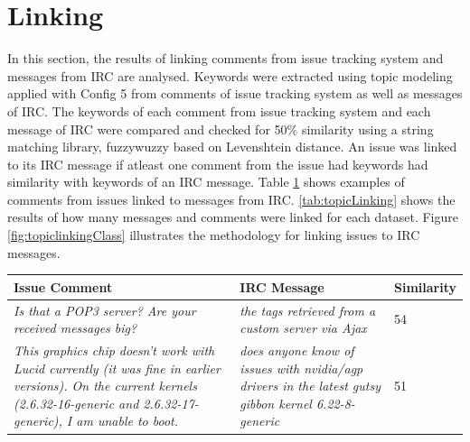\documentclass[a4paper,12pt,twoside]{report}
\begin{document}
\section{Linking}
In this section, the results of linking comments from issue tracking system and messages from \acs{IRC} are analysed. Keywords were extracted using topic modeling applied with Config 5 from comments of issue tracking system as well as messages of \acs{IRC}. The keywords of each comment from issue tracking system and each message of \acs{IRC} were compared and checked for 50\% similarity using a string matching library, fuzzywuzzy based on Levenshtein distance. An issue was linked to its \acs{IRC} message if atleast one comment from the issue had keywords had similarity with keywords of an \acs{IRC} message. Table \ref{tab:exampleLinking} shows examples of comments from issues linked to messages from \acs{IRC}. \ref{tab:topicLinking} shows the results of how many messages and comments were linked for each dataset. Figure \ref{fig:topiclinkingClass} illustrates the methodology for linking issues to \acs{IRC} messages. 

\begin{table} %
    \centering
    \begin{adjustbox}{max width=\columnwidth}
    \def\arraystretch{1} %
    \begin{tabular}{p{6cm} p{6cm} p{2cm}}
        \toprule
        \textbf{Issue Comment} & \textbf{\acs{IRC} Message} & \textbf{Similarity}\\
        \midrule
			\textit{Is that a POP3 server? Are your received messages big?} & \textit{the tags retrieved from a custom server via Ajax} & 54 \\
			\midrule
			\textit{This graphics chip doesn't work with Lucid currently (it was fine in earlier versions). On the current kernels (2.6.32-16-generic and 2.6.32-17-generic), I am unable to boot.} & \textit{does anyone know of issues with nvidia/agp drivers in the latest gutsy gibbon kernel 6.22-8-generic} & 51 \\
        \midrule
    \end{tabular}
    \end{adjustbox}
    \label{tab:exampleLinking}
\end{table}
\end{document}
